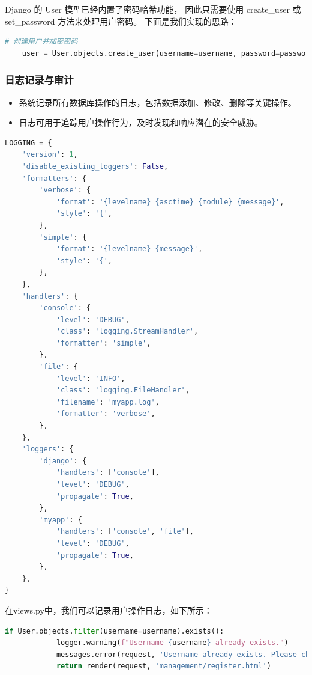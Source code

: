 \documentclass[UTF8,a4paper,12pt]{ctexart}
\begin{document}
Django 的 User 模型已经内置了密码哈希功能，
因此只需要使用 create\_user 或 set\_password 方法来处理用户密码。
下面是我们实现的思路：

\begin{lstlisting}[language=python]
    # 创建用户并加密密码
    user = User.objects.create_user(username=username, password=password)
\end{lstlisting}

\subsubsection{日志记录与审计}
\begin{itemize}
    \item 系统记录所有数据库操作的日志，包括数据添加、修改、删除等关键操作。
    \item 日志可用于追踪用户操作行为，及时发现和响应潜在的安全威胁。
\end{itemize}

\begin{lstlisting}[language=python]
    LOGGING = {
    'version': 1,
    'disable_existing_loggers': False,
    'formatters': {
        'verbose': {
            'format': '{levelname} {asctime} {module} {message}',
            'style': '{',
        },
        'simple': {
            'format': '{levelname} {message}',
            'style': '{',
        },
    },
    'handlers': {
        'console': {
            'level': 'DEBUG',
            'class': 'logging.StreamHandler',
            'formatter': 'simple',
        },
        'file': {
            'level': 'INFO',
            'class': 'logging.FileHandler',
            'filename': 'myapp.log',
            'formatter': 'verbose',
        },
    },
    'loggers': {
        'django': {
            'handlers': ['console'],
            'level': 'DEBUG',
            'propagate': True,
        },
        'myapp': {
            'handlers': ['console', 'file'],
            'level': 'DEBUG',
            'propagate': True,
        },
    },
}
\end{lstlisting}

在views.py中，我们可以记录用户操作日志，如下所示：

\begin{lstlisting}[language=python]
    if User.objects.filter(username=username).exists():
            logger.warning(f"Username {username} already exists.")
            messages.error(request, 'Username already exists. Please choose another one.')
            return render(request, 'management/register.html')
\end{lstlisting}
\end{document}
